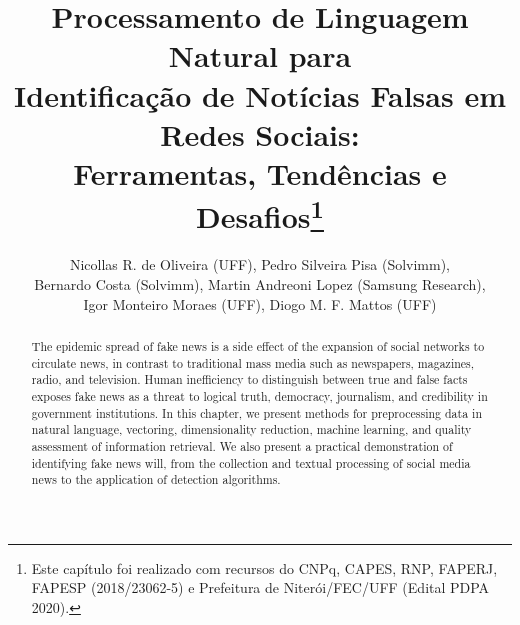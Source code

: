 \documentclass{SBCbookchapter}
\title{Processamento de Linguagem Natural para \\Identificação de Notícias Falsas em Redes Sociais:\\ Ferramentas, Tendências e Desafios\let\thefootnote\relax\footnote{Este capítulo foi realizado com recursos do CNPq, CAPES, RNP, FAPERJ, FAPESP (2018/23062-5) e Prefeitura de Niterói/FEC/UFF (Edital PDPA 2020).}
}
\author{Nicollas R. de Oliveira (UFF),
Pedro Silveira Pisa (Solvimm), \\Bernardo Costa (Solvimm), Martin Andreoni Lopez (Samsung Research), \\ Igor Monteiro Moraes (UFF), Diogo M. F. Mattos (UFF)
\vspace{-3mm}
}
\begin{document}
\maketitle

 
\begin{abstract}


The epidemic spread of fake news is a side effect of the expansion of social networks to circulate news, in contrast to traditional mass media such as newspapers, magazines, radio, and television. Human inefficiency to distinguish between true and false facts exposes fake news as a threat to logical truth, democracy, journalism, and credibility in government institutions. In this chapter, we present methods for preprocessing data in natural language, vectoring, dimensionality reduction, machine learning, and quality assessment of information retrieval. We also present a practical demonstration of identifying fake news will, from the collection and textual processing of social media news to the application of detection algorithms.

\end{abstract}
\end{document}
